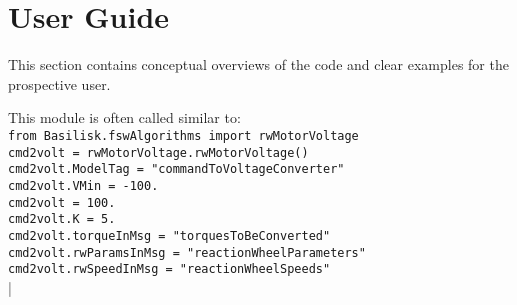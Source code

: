 \section{User Guide}
This section contains conceptual overviews of the code and clear examples for the prospective user. 

This module is often called similar to:\\
\verb|from Basilisk.fswAlgorithms import rwMotorVoltage|\\
\verb|cmd2volt = rwMotorVoltage.rwMotorVoltage()|\\
\verb|cmd2volt.ModelTag = "commandToVoltageConverter"|\\
\verb|cmd2volt.VMin = -100.|\\
\verb|cmd2volt = 100.|\\
\verb|cmd2volt.K = 5.|\\
\verb|cmd2volt.torqueInMsg = "torquesToBeConverted"|\\
\verb|cmd2volt.rwParamsInMsg = "reactionWheelParameters"|\\
\verb|cmd2volt.rwSpeedInMsg = "reactionWheelSpeeds"|\\


|
